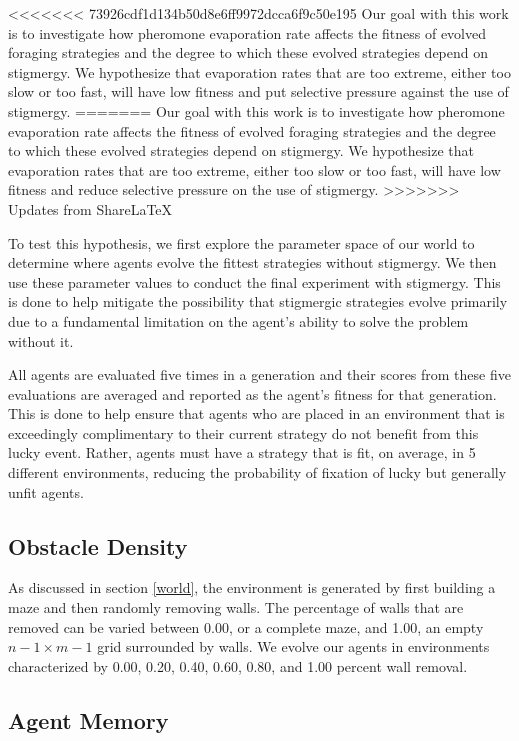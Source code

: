 <<<<<<< 73926cdf1d134b50d8e6ff9972dcca6f9c50e195
Our goal with this work is to investigate how pheromone evaporation rate affects the fitness of evolved foraging strategies and the degree to which these evolved strategies depend on stigmergy. We hypothesize that evaporation rates that are too extreme, either too slow or too fast, will have low fitness and put selective pressure against the use of stigmergy.
=======
Our goal with this work is to investigate how pheromone evaporation rate affects the fitness of evolved foraging strategies and the degree to which these evolved strategies depend on stigmergy. We hypothesize that evaporation rates that are too extreme, either too slow or too fast, will have low fitness and reduce selective pressure on the use of stigmergy.
>>>>>>> Updates from ShareLaTeX

To test this hypothesis, we first explore the parameter space of our world to determine where agents evolve the fittest strategies without stigmergy. We then use these parameter values to conduct the final experiment with stigmergy. This is done to help mitigate the possibility that stigmergic strategies evolve primarily due to a fundamental limitation on the agent's ability to solve the problem without it.

All agents are evaluated five times in a generation and their scores from these five evaluations are averaged and reported as the agent's fitness for that generation. This is done to help ensure that agents who are placed in an environment that is exceedingly complimentary to their current strategy do not benefit from this lucky event. Rather, agents must have a strategy that is fit, on average, in 5 different environments, reducing the probability of fixation of lucky but generally unfit agents.

\subsection*{Obstacle Density}

As discussed in section \ref{world}, the environment is generated by first building a maze and then randomly removing walls. The percentage of walls that are removed can be varied between 0.00, or a complete maze, and 1.00, an empty $n-1 \times m-1$ grid surrounded by walls. We evolve our agents in environments characterized by 0.00, 0.20, 0.40, 0.60, 0.80, and 1.00 percent wall removal.

\subsection*{Agent Memory}

